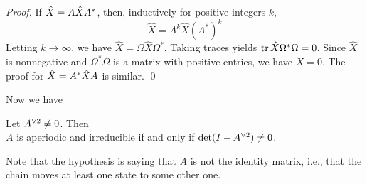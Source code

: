 \begin{proof} If $\hat X={A}{\hat X}{A}^*$, then, inductively for positive integers $k$,
$$ 
  \hat X=A^k\hat X (A^*)^k
$$
Letting $k\to\infty$, we have $\hat X=\Omega \hat X \Omega^*$. Taking traces yields ${\rm tr}\, \hat X \Omega^*\Omega=0$. 
Since $\hat X$ is nonnegative and $\Omega^*\Omega$ is a matrix with positive entries, we have $X=0$. 
The proof for $\hat X={A}^*{\hat X}{A}$ is similar.  \qed
\end{proof}

Now we have 

\begin{theorem}\label{thmIRPER}
Let ${A}^{\vee 2}\ne0$. 
Then\\ 
$A$ is aperiodic and irreducible if and only if $\det(I-{A}^{\vee 2})\ne 0$.
\end{theorem}

\begin{remark}		\label{rem:7.2}
Note that the hypothesis is saying that $A$ is not the identity matrix, i.e., that the chain moves at least one state to some other one.
\end{remark}

